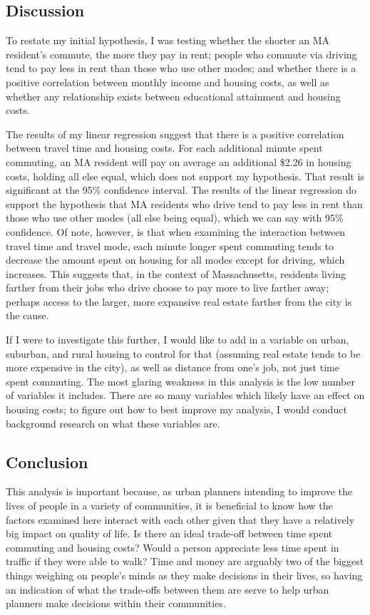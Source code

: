 \documentclass[
]{article}
\begin{document}
\hypertarget{discussion}{%
\subsection{Discussion}\label{discussion}}

To restate my initial hypothesis, I was testing whether the shorter an
MA resident's commute, the more they pay in rent; people who commute via
driving tend to pay less in rent than those who use other modes; and
whether there is a positive correlation between monthly income and
housing costs, as well as whether any relationship exists between
educational attainment and housing costs.

The results of my linear regression suggest that there is a positive
correlation between travel time and housing costs. For each additional
minute spent commuting, an MA resident will pay on average an additional
\$2.26 in housing costs, holding all else equal, which does not support
my hypothesis. That result is significant at the 95\% confidence
interval. The results of the linear regression do support the hypothesis
that MA residents who drive tend to pay less in rent than those who use
other modes (all else being equal), which we can say with 95\%
confidence. Of note, however, is that when examining the interaction
between travel time and travel mode, each minute longer spent commuting
tends to decrease the amount spent on housing for all modes except for
driving, which increases. This suggests that, in the context of
Massachusetts, residents living farther from their jobs who drive choose
to pay more to live farther away; perhaps access to the larger, more
expansive real estate farther from the city is the cause.

If I were to investigate this further, I would like to add in a variable
on urban, suburban, and rural housing to control for that (assuming real
estate tends to be more expensive in the city), as well as distance from
one's job, not just time spent commuting. The most glaring weakness in
this analysis is the low number of variables it includes. There are so
many variables which likely have an effect on housing costs; to figure
out how to best improve my analysis, I would conduct background research
on what these variables are.

\hypertarget{conclusion}{%
\subsection{Conclusion}\label{conclusion}}

This analysis is important because, as urban planners intending to
improve the lives of people in a variety of communities, it is
beneficial to know how the factors examined here interact with each
other given that they have a relatively big impact on quality of life.
Is there an ideal trade-off between time spent commuting and housing
costs? Would a person appreciate less time spent in traffic if they were
able to walk? Time and money are arguably two of the biggest things
weighing on people's minds as they make decisions in their lives, so
having an indication of what the trade-offs between them are serve to
help urban planners make decisions within their communities.
\end{document}
